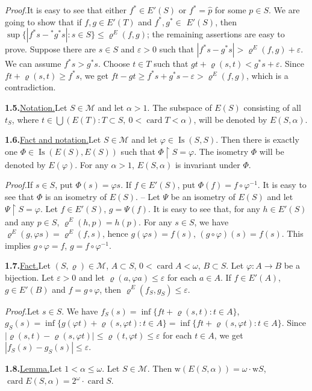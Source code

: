\documentclass[12pt,a4paper]{article}
\newcommand{\M}{\mathcal{M}}
\newcommand{\card}{\operatorname{card}}
\newcommand{\Is}{\operatorname{Is}}
\newcommand{\wt}{\mathrm{w}}
\newcommand{\res}{\mathbin{\upharpoonright}}
\newcommand{\itemhead}[2]{\par\noindent\textbf{#1.}\enspace\underline{#2.}\enspace}
\newcommand{\prooftext}{\par\textit{Proof.}\enspace}
\begin{document}
\prooftext It is easy to see that either $f^*\in E'(S)$ or $f^*=\hat p$ for some $p\in S$. We are going to show that if $f,g\in E'(T)$ and $f^*,g^*\in$
\newpage %
\noindent $E'(S)$, then $\sup\{|f^*s-{}^*g^*s|:s\in S\}\leq\varrho^E(f,g)$; the remaining assertions are easy to prove. Suppose there are $s\in S$ and $\varepsilon>0$ such that $|f^*s-g^*s|>\varrho^E(f,g)+\varepsilon$. We can assume $f^*s>g^*s$. Choose $t\in T$ such that $gt+\varrho(s,t)<g^*s+\varepsilon$. Since $ft+\varrho(s,t)\geq f^*s$, we get $ft-gt\geq f^*s+g^*s-\varepsilon>\varrho^E(f,g)$, which is a contradiction.

\itemhead{1.5}{Notation}Let $S\in\M$ and let $\alpha>1$. The subspace of $E(S)$ consisting of all $t_S$, where $t\in\bigcup(E(T):T\subset S,\ 0<\card T<\alpha)$, will be denoted by $E(S,\alpha)$.

\itemhead{1.6}{Fact and notation}Let $S\in\M$ and let $\varphi\in\Is(S,S)$. Then there is exactly one $\Phi\in\Is(E(S),E(S))$ such that $\Phi\res S=\varphi$. The isometry $\Phi$ will be denoted by $E(\varphi)$. For any $\alpha>1$, $E(S,\alpha)$ is invariant under $\Phi$.

\prooftext If $s\in S$, put $\Phi(s)=\varphi s$. If $f\in E'(S)$, put $\Phi(f)=f\circ\varphi^{-1}$. It is easy to see that $\Phi$ is an isometry of $E(S)$. -- Let $\Psi$ be an isometry of $E(S)$ and let $\Psi\res S=\varphi$. Let $f\in E'(S)$, $g=\Psi(f)$. It is easy to see that, for any $h\in E'(S)$ and any $p\in S$, $\varrho^E(h,p)=h(p)$. For any $s\in S$, we have $\varrho^E(g,\varphi s)=\varrho^E(f,s)$, hence $g(\varphi s)=f(s)$, $(g\circ\varphi)(s)=f(s)$. This implies $g\circ\varphi=f$, $g=f\circ\varphi^{-1}$.

\itemhead{1.7}{Fact}Let $(S,\varrho)\in\M$, $A\subset S$, $0<\card A<\omega$, $B\subset S$. Let $\varphi:A\longrightarrow B$ be a bijection. Let $\varepsilon>0$ and let $\varrho(a,\varphi a)\leq\varepsilon$ for each $a\in A$. If $f\in E'(A)$, $g\in E'(B)$ and $f=g\circ\varphi$, then $\varrho^E(f_S,g_S)\leq\varepsilon$.

\prooftext Let $s\in S$. We have $f_S(s)=\inf\{ft+\varrho(s,t):t\in A\}$, $g_S(s)=\inf\{g(\varphi t)+\varrho(s,\varphi t):t\in A\}=\inf\{ft+\varrho(s,\varphi t):t\in A\}$. Since $|\varrho(s,t)-\varrho(s,\varphi t)|\leq\varrho(t,\varphi t)\leq\varepsilon$ for each $t\in A$, we get $|f_S(s)-g_S(s)|\leq\varepsilon$.

\itemhead{1.8}{Lemma}Let $1<\alpha\leq\omega$. Let $S\in\M$. Then $\wt(E(S,\alpha))=\omega\cdot\wt S$, $\card E(S,\alpha)=2^\omega\cdot\card S$.
\end{document}
